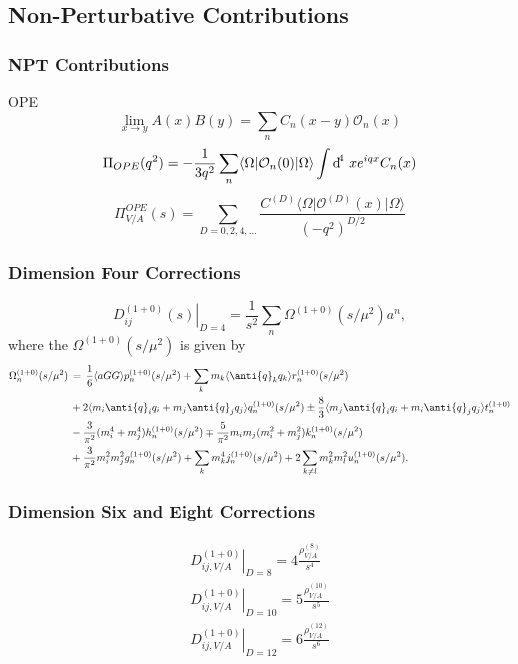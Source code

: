 \documentclass{beamer}
\begin{document}
\subsection{Non-Perturbative Contributions}
\begin{frame}
  \frametitle{NPT Contributions}
  OPE
  \begin{equation}
    \lim_{x\to y} A(x) B(y) = \sum_n C_n(x-y) \mathcal{O}_n(x)
  \end{equation}
  \begin{equation}
    \Pi_{OPE}(q^2) = - \frac{1}{3 q^2} \sum_n \langle \Omega \vert \mathcal{O}_n(0) \vert \Omega \rangle \int \dif^4 \, x e^{iqx} C_n(x)
  \end{equation}
  \begin{equation}
    \Pi_{V/A}^{OPE}(s) = \sum_{D=0,2,4,\dots} \frac{C^{(D)}\langle \Omega \vert \mathcal{O}^{(D)} (x) \vert \Omega \rangle}{(-q^2)^{D/2}}
  \end{equation}
\end{frame}
\begin{frame}
  \frametitle{Dimension Four Corrections}
  \begin{equation}
    \left. D_{ij}^{(1+0)}(s) \right\rvert_{D=4} = \frac{1}{s^2} \sum_n \Omega^{(1+0)}(s/\mu^2)a^n,
  \end{equation}
  where the \(\Omega^{(1+0)}(s/\mu^2)\) is given by
  \begin{equation}
    \begin{split}
      \Omega_n^{(1+0)} (s/\mu^2) &\,=\, \frac{1}{6}\langle aGG \rangle p_n^{(1+0)}(s/\mu^2) + \sum_k m_k \langle \anti{q}_k q_k \rangle r_n^{(1+0)}(s/\mu^2) \\
      &\,+ 2\langle m_i \anti{q}_i q_i + m_j \anti{q}_j q_j \rangle q_n^{(1+0)} (s/\mu^2) \pm \frac{8}{3} \langle m_j \anti{q}_i q_i + m_i \anti{q}_j q_j \rangle t_n^{(1+0)} \\
      &\,- \frac{3}{\pi^2} (m_i^4 + m_j^4) h_n^{(1+0)} (s/\mu^2) \mp \frac{5}{\pi^2} m_i m_j (m_i^2 + m_j^2) k_n^{(1+0)}(s/\mu^2)\\
      &\,+ \frac{3}{\pi^2} m_i^2 m_j^2 g_n^{(1+0)}(s/\mu^2) + \sum_k m_k^4
      j_n^{(1+0)}(s/\mu^2) + 2 \sum_{k \neq l} m_k^2 m_l^2 u_n^{(1+0)}(s/\mu^2).
    \end{split}
  \end{equation}
\end{frame}
\begin{frame}
  \frametitle{Dimension Six  and Eight Corrections}
  \begin{equation}
    \begin{split}
      \left. D_{ij,V/A}^{(1+0)} \right\rvert_{D=8} = 4 \frac{\rho_{V/A}^{(8)}}{s^4} \\
      \left. D_{ij,V/A}^{(1+0)} \right\rvert_{D=10} = 5 \frac{\rho_{V/A}^{(10)}}{s^5} \\
      \left. D_{ij,V/A}^{(1+0)} \right\rvert_{D=12} = 6 \frac{\rho_{V/A}^{(12)}}{s^6}
    \end{split} 
  \end{equation}
\end{frame}
\end{document}
